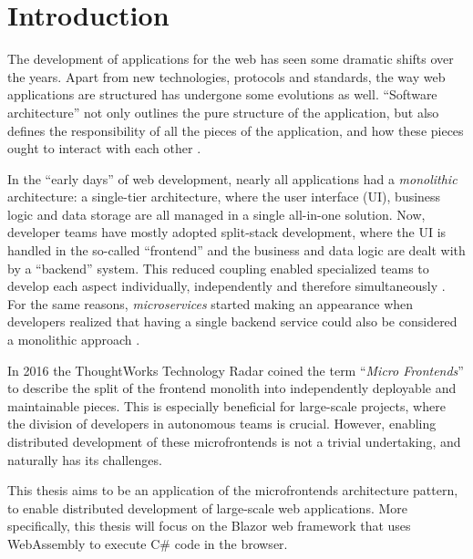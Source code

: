 
\section{Introduction}
\label{sec:introduction}

The development of applications for the web has seen some dramatic shifts over
the years. Apart from new technologies, protocols and standards, the way web
applications are structured has undergone some evolutions as well. ``Software
architecture'' not only outlines the pure structure of the application, but also
defines the responsibility of all the pieces of the application, and how these
pieces ought to interact with each other \autocite{Fedorov_etal_1998}.

In the ``early days'' of web development, nearly all applications had a
\textit{monolithic} architecture: a single-tier architecture, where the user
interface (UI), business logic and data storage are all managed in a single
all-in-one solution. Now, developer teams have mostly adopted split-stack
development, where the UI is handled in the so-called ``frontend'' and the
business and data logic are dealt with by a ``backend'' system. This reduced
coupling enabled specialized teams to develop each aspect individually,
independently and therefore simultaneously \autocite{Dunkley_2016}. For the same
reasons, \textit{microservices} started making an appearance when developers
realized that having a single backend service could also be considered a
monolithic approach \autocite{Fowler_Microservices_2014}.

In 2016 the ThoughtWorks Technology Radar \autocite{ThoughtWorks_2020} coined
the term ``\textit{Micro Frontends}'' to describe the split of the frontend
monolith into independently deployable and maintainable pieces. This is
especially beneficial for large-scale projects, where the division of developers
in autonomous teams is crucial. However, enabling distributed development of
these microfrontends is not a trivial undertaking, and naturally has its
challenges.

This thesis aims to be an application of the microfrontends architecture
pattern, to enable distributed development of large-scale web applications. More
specifically, this thesis will focus on the
Blazor web framework that uses
WebAssembly to execute
C\# code in the browser.   

